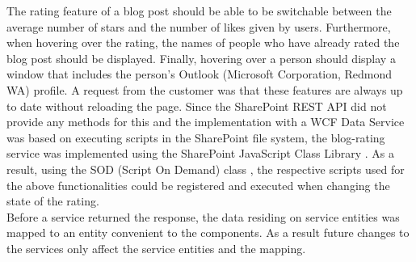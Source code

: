 \documentclass[Bachelor,BIF,english]{twbook}
\begin{document}
The rating feature of a blog post should be able to be switchable between the average number of stars and the number of likes given by users. Furthermore, when hovering over the rating, the names of people who have already rated the blog post should be displayed. Finally, hovering over a person should display a window that includes the person's Outlook (Microsoft Corporation, Redmond WA) profile. A request from the customer was that these features are always up to date without reloading the page. Since the SharePoint REST API did not provide any methods for this and the implementation with a WCF Data Service was based on executing scripts in the SharePoint file system, the blog-rating service was implemented using the SharePoint JavaScript Class Library \cite{SpJavaScriptClassLibrary}. As a result, using the SOD (Script On Demand) class \cite{SpSod}, the respective scripts used for the above functionalities could be registered and executed when changing the state of the rating.
\\[\baselineskip]
Before a service returned the response, the data residing on service entities was mapped to an entity convenient to the components. As a result future changes to the services only affect the service entities and the mapping.
\end{document}

